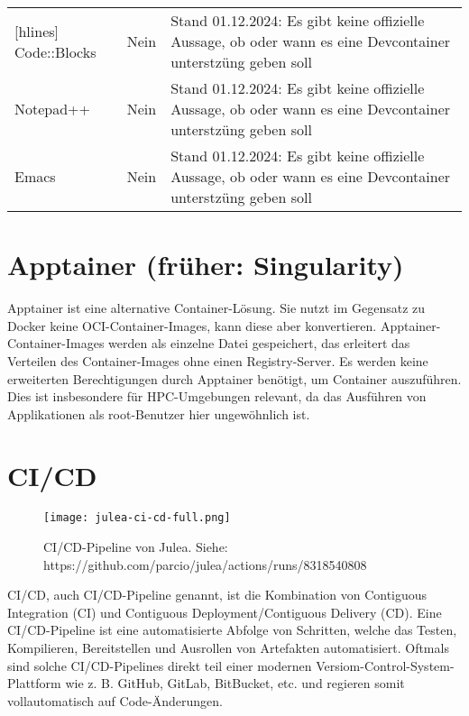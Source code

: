 \begin{table}[H]
\begin{NiceTabular}{X|X|X[4]}[hlines]
        Code::Blocks       & Nein          & Stand 01.12.2024: Es gibt keine offizielle Aussage, ob oder wann es eine Devcontainer unterstzüng geben soll                                                                                                            \\
        Notepad++          & Nein          & Stand 01.12.2024: Es gibt keine offizielle Aussage, ob oder wann es eine Devcontainer unterstzüng geben soll                                                                                                            \\
        Emacs              & Nein          & Stand 01.12.2024: Es gibt keine offizielle Aussage, ob oder wann es eine Devcontainer unterstzüng geben soll                                                                                                            \\
    \end{NiceTabular}
\end{table}

\section{Apptainer (früher: Singularity)}

Apptainer ist eine alternative Container-Lösung. Sie nutzt im Gegensatz zu Docker keine OCI-Container-Images, kann diese aber konvertieren. Apptainer-Container-Images werden als einzelne Datei gespeichert, das erleitert das Verteilen des Container-Images ohne einen Registry-Server. Es werden keine erweiterten Berechtigungen durch Apptainer benötigt, um Container auszuführen. Dies ist insbesondere für HPC-Umgebungen relevant, da das Ausführen von Applikationen als root-Benutzer hier ungewöhnlich ist.

\section{CI/CD}

\begin{figure}[H]
    \texttt{[image: julea-ci-cd-full.png]}
    \caption{CI/CD-Pipeline von Julea. \newline
        Siehe: https://github.com/parcio/julea/actions/runs/8318540808}
\end{figure}

CI/CD, auch CI/CD-Pipeline genannt, ist die Kombination von Contiguous Integration (CI) und Contiguous Deployment/Contiguous Delivery (CD). Eine CI/CD-Pipeline ist eine automatisierte Abfolge von Schritten, welche das Testen, Kompilieren, Bereitstellen und Ausrollen von Artefakten automatisiert. Oftmals sind solche CI/CD-Pipelines direkt teil einer modernen Versiom-Control-System-Plattform wie z. B. GitHub, GitLab, BitBucket, etc. und regieren somit vollautomatisch auf Code-Änderungen.

